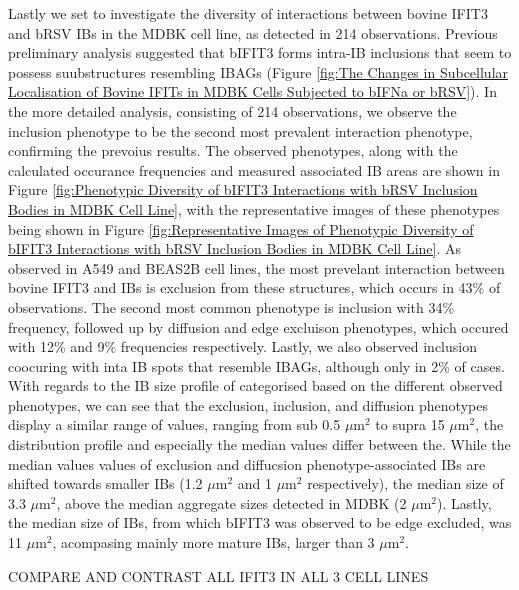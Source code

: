 Lastly we set to investigate the diversity of interactions between bovine IFIT3 and bRSV IBs in the MDBK cell line, as detected in 214 observations. Previous preliminary analysis suggested that bIFIT3 forms intra-IB inclusions that seem to possess suubstructures resembling IBAGs (Figure \ref{fig:The Changes in Subcellular Localisation of Bovine IFITs in MDBK Cells Subjected to bIFNa or bRSV}). In the more detailed analysis, consisting of 214 observations, we observe the inclusion phenotype to be the second most prevalent interaction phenotype, confirming the prevoius results. The observed phenotypes, along with the calculated occurance frequencies and measured associated IB areas are shown in Figure \ref{fig:Phenotypic Diversity of bIFIT3 Interactions with bRSV Inclusion Bodies in MDBK Cell Line}, with the representative images of these phenotypes being shown in Figure \ref{fig:Representative Images of Phenotypic Diversity of bIFIT3 Interactions with bRSV Inclusion Bodies in MDBK Cell Line}. As observed in A549 and BEAS2B cell lines, the most prevelant interaction between bovine IFIT3 and IBs is exclusion from these structures, which occurs in 43\% of observations. The second most common phenotype is inclusion with 34\% frequency, followed up by diffusion and edge excluison phenotypes, which occured with 12\% and 9\% frequencies respectively. Lastly, we also observed inclusion coocuring with inta IB spots that resemble IBAGs, although only in 2\% of cases. With regards to the IB size profile of categorised based on the different observed phenotypes, we can see that the exclusion, inclusion, and diffusion phenotypes display a similar range of values, ranging from sub 0.5 \(\mu \mbox{m}^2\) to supra 15 \(\mu \mbox{m}^2\), the distribution profile and especially the median values differ between the. While the median values values of exclusion and diffucsion phenotype-associated IBs are shifted towards smaller IBs (1.2 \(\mu \mbox{m}^2\) and 1 \(\mu \mbox{m}^2\) respectively), the median size of 3.3 \(\mu \mbox{m}^2\), above the median aggregate sizes detected in MDBK (2 \(\mu \mbox{m}^2\)). Lastly, the median size of IBs, from which bIFIT3 was observed to be edge excluded, was 11 \(\mu \mbox{m}^2\), acompasing mainly more mature IBs, larger than 3 \(\mu \mbox{m}^2\).

COMPARE AND CONTRAST ALL IFIT3 IN ALL 3 CELL LINES

